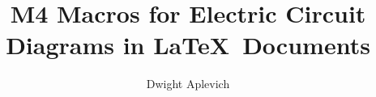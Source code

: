 \documentclass{article}
\renewcommand\contentsname{Contents, \Version}
\begin{document}
\title{M4 Macros for Electric Circuit Diagrams in \LaTeX\ Documents}
\author{Dwight Aplevich}
\enlargethispage{\baselineskip}
\date{%
%
\vspace*{-\baselineskip}
}
\maketitle
\begin{multicols}{2}
  \tableofcontents
\end{multicols}




\makeatletter
\addcontentsline{toc}{section}{References\ \unhbox \voidb@x
 \cleaders \hbox{\hss .$\;$\hss }\hfill \kern \z@ }
\makeatother

   
\end{document}
